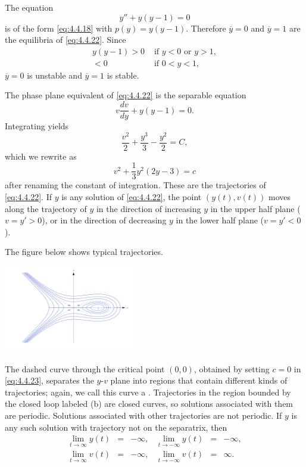 \documentclass{ximera}
\begin{document}
\begin{example} \label{example:4.4.3}
The equation
\begin{equation} \label{eq:4.4.22}
y''+y(y-1)=0
\end{equation}
is of the form \eqref{eq:4.4.18} with $p(y)=y(y-1)$. Therefore $\overline{y}=0$ and $\overline{y}=1$ are the equilibria of \eqref{eq:4.4.22}. Since
\begin{eqnarray*}
y(y-1)>0 &\mbox{ if } y<0\mbox{ or }y>1,\\
<0&\mbox{ if } 0<y<1,
\end{eqnarray*}
$\overline{y}=0$ is unstable and $\overline{y}=1$ is
stable.

The phase plane equivalent of \eqref{eq:4.4.22} is the separable equation
$$
v\frac{dv}{dy}+y(y-1)=0.
$$
Integrating yields
$$
\frac{v^2}{2}+\frac{y^3}{3}-\frac{y^2}{2}=C,
$$
which we rewrite  as
\begin{equation} \label{eq:4.4.23}
v^2+\frac{1}{3}y^2(2y-3)=c
\end{equation}
after renaming the constant of integration. These are the trajectories
of \eqref{eq:4.4.22}. If $y$ is any solution of \eqref{eq:4.4.22},  the
point $(y(t),v(t))$ moves along the trajectory of $y$ in the direction
of increasing $y$ in the upper half plane ($v=y'>0$), or in the
direction of decreasing $y$ in the lower half plane ($v=y'<0$).

The figure below shows
typical trajectories. 

\begin{image}
 \includegraphics[height=1.5in]{fig040410.jpg} 
\end{image}


The
dashed curve through the critical point $(0,0)$, obtained by setting
$c=0$ in \eqref{eq:4.4.23}, separates the $y$-$v$ plane into regions
that contain different kinds of trajectories; again,
 we call this curve a .
Trajectories in the region bounded by the closed loop labeled (b) are closed
curves,
so solutions associated with them are periodic. Solutions associated
with other trajectories are not periodic. If $y$ is any such solution
with trajectory not  on the separatrix, then
$$
\begin{array}{llrllr}
\lim_{t\rightarrow\infty}y(t)&=&-\infty, &\lim_{t\rightarrow-\infty}y(t)&=&-\infty,\\
\lim_{t\rightarrow\infty}v(t)&=&-\infty,
&\lim_{t\rightarrow-\infty}v(t)&=&\infty.
\end{array}
$$


\end{example}
\end{document}
